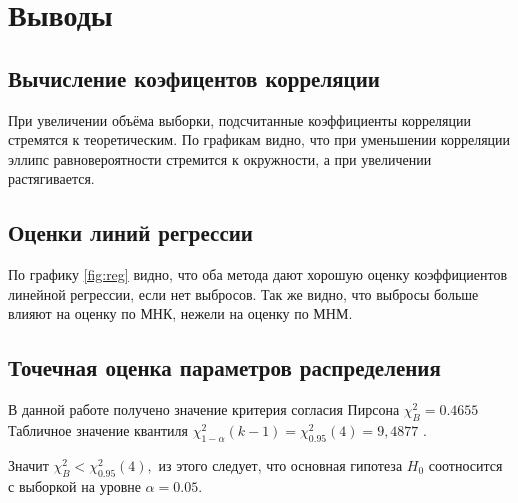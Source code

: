 \documentclass[a4]{article}
\begin{document}
\section{Выводы} %
\label{sec:выводы}
\subsection{Вычисление коэфицентов корреляции} %
\label{sub:вычисление_коэфицентов_корреляции}
При увеличении объёма выборки, подсчитанные коэффициенты корреляции стремятся к теоретическим. По графикам видно, что при уменьшении корреляции эллипс равновероятности стремится к окружности, а при увеличении растягивается.
\subsection{Оценки линий регрессии} %
\label{sub:оценки_линий_регрессии}
По графику \ref{fig:reg} видно, что оба метода дают хорошую оценку коэффициентов линейной регрессии, если нет выбросов. Так же видно, что выбросы больше влияют на оценку по МНК,
нежели на оценку по МНМ.
\subsection{Точечная оценка параметров распределения} %
\label{sub:точечная_оценка_параметров_распределения}
В данной работе получено значение критерия согласия Пирсона $\chi_B^2 = 0.4655$ Табличное значение квантиля  $\chi^2_{1-\alpha}(k-1)=\chi^2_{0.95}(4) = 9,4877$ \cite{chi_quant}.

Значит $\chi_B^2 < \chi^2_{0.95}(4),$ из этого следует, что основная гипотеза $H_0$ соотносится с выборкой на уровне $\alpha = 0.05.$
\end{document}
